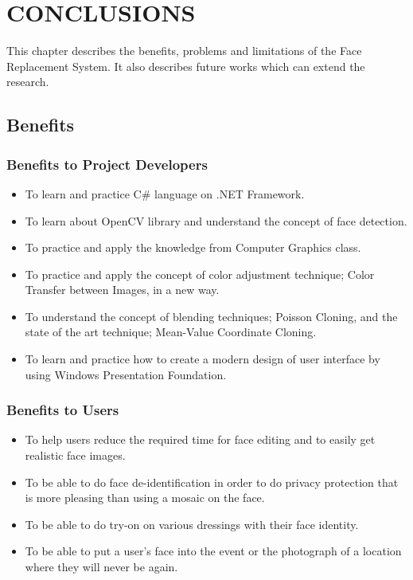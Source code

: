 \chapter{CONCLUSIONS}\label{chap:CONCLUSIONS}
\hspace{0.5in}This chapter describes the benefits, problems and limitations of the Face Replacement System. It also describes future works which can extend the research.

\section{Benefits}

\subsection{Benefits to Project Developers}
\begin{itemize}
\item To learn and practice C\# language on .NET Framework.
\item To learn about OpenCV library and understand the concept of face detection.
\item To practice and apply the knowledge from Computer Graphics class.
\item To practice and apply the concept of color adjustment technique; Color Transfer between Images, in a new way.
\item To understand the concept of blending techniques; Poisson Cloning, and the state of the art technique; Mean-Value Coordinate Cloning.
\item To learn and practice how to create a modern design of user interface by using Windows Presentation Foundation.
\end{itemize}

\subsection{Benefits to Users}
\begin{itemize}
\item To help users reduce the required time for face editing and to easily get realistic face images.
\item To be able to do face de-identification in order to do privacy protection that is more pleasing than using a mosaic on the face.
\item To be able to do try-on on various dressings with their face identity.
\item To be able to put a user's face into the event or the photograph of a location where they will never be again.
\end{itemize}


